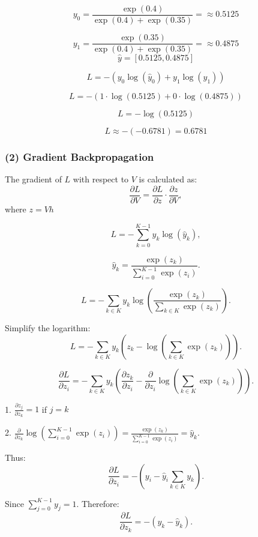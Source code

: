 \documentclass[12pt]{article}
\begin{document}
\[
\hat{y_0} = \frac{\exp(0.4)}{\exp(0.4) + \exp(0.35)} =  \approx 0.5125
\]

\[
\hat{y_1} =\frac{\exp(0.35)}{\exp(0.4) + \exp(0.35)} =  \approx 0.4875
\]
\[
\hat{y} = [0.5125, 0.4875]
\]

\[
L = -\left(y_0 \log(\hat{y}_0) + y_1 \log(\hat{y}_1)\right)
\]

\[
L = -\left(1 \cdot \log(0.5125) + 0 \cdot \log(0.4875)\right)
\]




\[
L = -\log(0.5125)
\]

\[
L \approx -(-0.6781) = 0.6781
\]





\newpage
\subsubsection*{(2) Gradient Backpropagation}






The gradient of \( L \) with respect to \( V \) is calculated as:
\[
\frac{\partial L}{\partial V} = \frac{\partial L}{\partial z} \cdot \frac{\partial z}{\partial V},
\]
where \( z = Vh \) 


\[
L = -\sum_{k=0}^{K-1} y_k \log(\hat{y}_k),
\]

\[
\hat{y}_k = \frac{\exp(z_k)}{\sum_{i=0}^{K-1} \exp(z_i)}.
\]

\[
L = -\sum_{k\in K} y_k \log\left(\frac{\exp(z_k)}{\sum_{k\in K }^{} \exp(z_k)}\right).
\]

Simplify the logarithm:
\[
L = -\sum_{k\in K}^{} y_k \left(z_k - \log\left(\sum_{k\in K}^{} \exp(z_k)\right)\right).
\]


\[
\frac{\partial L}{\partial z_i} = -\sum_{k\in K}^{} y_k \left(\frac{\partial z_k}{\partial z_i} - \frac{\partial}{\partial z_i} \log\left(\sum_{k\in K}^{} \exp(z_k)\right)\right).
\]

1. \(\frac{\partial z_j}{\partial z_k} = 1\) if \( j = k \)


2. \(\frac{\partial}{\partial z_k} \log\left(\sum_{i=0}^{K-1} \exp(z_i)\right) = \frac{\exp(z_k)}{\sum_{i=0}^{K-1} \exp(z_i)} = \hat{y}_k\).

\vspace{1cm}
Thus:
\[
\frac{\partial L}{\partial z_i} = -\left(y_i - \hat{y}_i \sum_{k \in K}^{} y_k\right).
\]

Since \(\sum_{j=0}^{K-1} y_j = 1\). Therefore:
\[
\frac{\partial L}{\partial z_k} = -(y_k - \hat{y}_k).
\]
\end{document}
